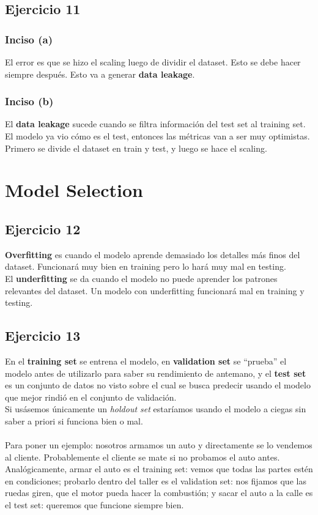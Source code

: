 \documentclass[a4paper,12pt]{article}
\begin{document}
        \subsection*{Ejercicio 11}
            \subsubsection*{Inciso (a)}
                \noindent El error es que se hizo el scaling luego de dividir el dataset. Esto se debe hacer siempre después. Esto va a generar \textbf{data leakage}.
            \subsubsection*{Inciso (b)}
                \noindent El \textbf{data leakage} sucede cuando se filtra información del test set al training set. El modelo ya vio cómo es el test, entonces las métricas van a ser muy optimistas. Primero se divide el dataset en train y test, y luego se hace el scaling.
    \section*{Model Selection}
        \subsection*{Ejercicio 12}
            \noindent \textbf{Overfitting} es cuando el modelo aprende demasiado los detalles más finos del dataset. Funcionará muy bien en training pero lo hará muy mal en testing. \\
            El \textbf{underfitting} se da cuando el modelo no puede aprender los patrones relevantes del dataset. Un modelo con underfitting funcionará mal en training y testing.
        \subsection*{Ejercicio 13}
            \noindent En el \textbf{training set} se entrena el modelo, en \textbf{validation set} se ``prueba'' el modelo antes de utilizarlo para saber su rendimiento de antemano, y el \textbf{test set} es un conjunto de datos no visto sobre el cual se busca predecir usando el modelo que mejor rindió en el conjunto de validación. \\
            Si usásemos únicamente un \emph{holdout set} estaríamos usando el modelo a ciegas sin saber a priori si funciona bien o mal. \\
            \\
            \noindent Para poner un ejemplo: nosotros armamos un auto y directamente se lo vendemos al cliente. Probablemente el cliente se mate si no probamos el auto antes. Analógicamente, armar el auto es el training set: vemos que todas las partes estén en condiciones; probarlo dentro del taller es el validation set: nos fijamos que las ruedas giren, que el motor pueda hacer la combustión; y sacar el auto a la calle es el test set: queremos que funcione siempre bien.
\end{document}

